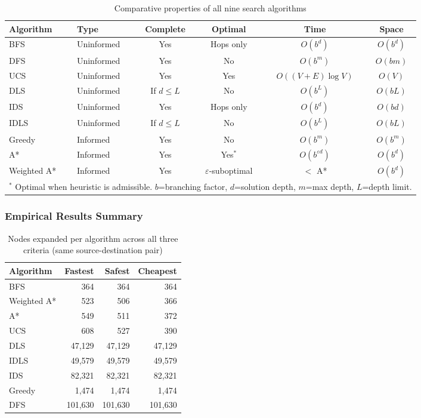 ﻿\documentclass[a4paper, 12pt]{article}
\theoremstyle{remark}
\begin{document}
\begin{table}[h!]
\centering
\caption{Comparative properties of all nine search algorithms}
\label{tab:algo_compare}
\begin{tabular}{llcccc}
\toprule
\textbf{Algorithm} & \textbf{Type} & \textbf{Complete} & \textbf{Optimal} & \textbf{Time} & \textbf{Space} \\
\midrule
BFS   & Uninformed & Yes & Hops only & $O(b^d)$   & $O(b^d)$ \\
DFS   & Uninformed & Yes & No        & $O(b^m)$   & $O(bm)$  \\
UCS   & Uninformed & Yes & Yes       & $O((V{+}E)\log V)$ & $O(V)$ \\
DLS   & Uninformed & If $d \leq L$ & No & $O(b^L)$ & $O(bL)$ \\
IDS   & Uninformed & Yes & Hops only & $O(b^d)$   & $O(bd)$  \\
IDLS  & Uninformed & If $d \leq L$ & No & $O(b^L)$ & $O(bL)$ \\
Greedy & Informed  & Yes & No        & $O(b^m)$   & $O(b^m)$ \\
A*    & Informed   & Yes & Yes$^*$   & $O(b^{\varepsilon d})$ & $O(b^d)$ \\
Weighted A* & Informed & Yes & $\varepsilon$-suboptimal & $< $ A* & $O(b^d)$ \\
\bottomrule
\multicolumn{6}{l}{\small $^*$ Optimal when heuristic is admissible. $b$=branching factor, $d$=solution depth, $m$=max depth, $L$=depth limit.}
\end{tabular}
\end{table}

\subsubsection{Empirical Results Summary}

\begin{table}[h!]
\centering
\caption{Nodes expanded per algorithm across all three criteria (same source-destination pair)}
\label{tab:nodes_expanded}
\begin{tabular}{lrrr}
\toprule
\textbf{Algorithm} & \textbf{Fastest} & \textbf{Safest} & \textbf{Cheapest} \\
\midrule
BFS          &    364 &    364 &    364 \\
Weighted A*  &    523 &    506 &    366 \\
A*           &    549 &    511 &    372 \\
UCS          &    608 &    527 &    390 \\
DLS          & 47,129 & 47,129 & 47,129 \\
IDLS         & 49,579 & 49,579 & 49,579 \\
IDS          & 82,321 & 82,321 & 82,321 \\
Greedy       &  1,474 &  1,474 &  1,474 \\
DFS          & 101,630 & 101,630 & 101,630 \\
\bottomrule
\end{tabular}
\end{table}
\end{document}
